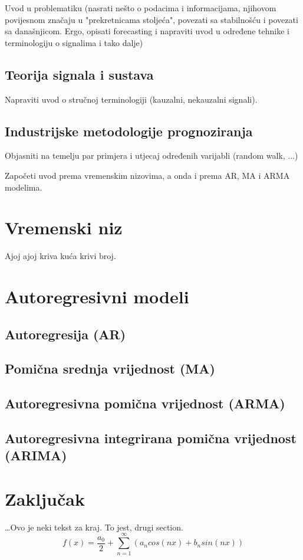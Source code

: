 \documentclass[a4paper,12pt,oneside]{memoir}
\newcommand{\fourierovred}{f(x)= \frac{a_0}{2}+\sum_{n=1}^\infty (a_n cos(nx)+b_n sin(nx))}
\begin{document}


        Uvod u problematiku (nasrati nešto o podacima i informacijama, njihovom povijesnom značaju u "prekretnicama stoljeća", povezati sa stabilnošću i povezati sa današnjicom. Ergo, opisati forecasting i napraviti uvod u određene tehnike i terminologiju o signalima i tako dalje)
        \section{Teorija signala i sustava}
            Napraviti uvod o stručnoj terminologiji (kauzalni, nekauzalni signali).
        \section{Industrijske metodologije prognoziranja}
            Objasniti na temelju par primjera i utjecaj određenih varijabli (random walk, ...)

            Započeti uvod prema vremenskim nizovima, a onda i prema AR, MA i ARMA modelima.
    \chapter{Vremenski niz}
        Ajoj ajoj kriva kuća krivi broj.
    \chapter{Autoregresivni modeli}
        \section{Autoregresija (AR)}
        \section{Pomična srednja vrijednost (MA)}
        \section{Autoregresivna pomična vrijednost (ARMA)}
        \section{Autoregresivna integrirana pomična vrijednost (ARIMA)}
    \chapter{Zaključak}
        \ldots{}Ovo je neki tekst za kraj. To jest, drugi section.
        $$\fourierovred$$
\end{document}
